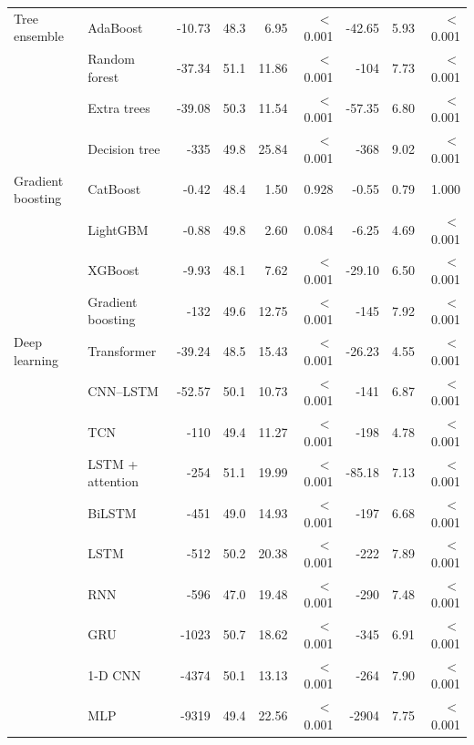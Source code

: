 \begin{table}[t]
\begin{tabular}{llrrrrrrr}
\addlinespace[2pt]
Tree ensemble & AdaBoost & -10.73 & 48.3 & 6.95 & $<$0.001 & -42.65 & 5.93 & $<$0.001 \\
 & Random forest & -37.34 & 51.1 & 11.86 & $<$0.001 & -104 & 7.73 & $<$0.001 \\
 & Extra trees & -39.08 & 50.3 & 11.54 & $<$0.001 & -57.35 & 6.80 & $<$0.001 \\
 & Decision tree & -335 & 49.8 & 25.84 & $<$0.001 & -368 & 9.02 & $<$0.001 \\
\addlinespace[2pt]
Gradient boosting & CatBoost & -0.42 & 48.4 & 1.50 & 0.928 & -0.55 & 0.79 & 1.000 \\
 & LightGBM & -0.88 & 49.8 & 2.60 & 0.084 & -6.25 & 4.69 & $<$0.001 \\
 & XGBoost & -9.93 & 48.1 & 7.62 & $<$0.001 & -29.10 & 6.50 & $<$0.001 \\
 & Gradient boosting & -132 & 49.6 & 12.75 & $<$0.001 & -145 & 7.92 & $<$0.001 \\
\addlinespace[2pt]
Deep learning & Transformer & -39.24 & 48.5 & 15.43 & $<$0.001 & -26.23 & 4.55 & $<$0.001 \\
 & CNN--LSTM & -52.57 & 50.1 & 10.73 & $<$0.001 & -141 & 6.87 & $<$0.001 \\
 & TCN & -110 & 49.4 & 11.27 & $<$0.001 & -198 & 4.78 & $<$0.001 \\
 & LSTM + attention & -254 & 51.1 & 19.99 & $<$0.001 & -85.18 & 7.13 & $<$0.001 \\
 & BiLSTM & -451 & 49.0 & 14.93 & $<$0.001 & -197 & 6.68 & $<$0.001 \\
 & LSTM & -512 & 50.2 & 20.38 & $<$0.001 & -222 & 7.89 & $<$0.001 \\
 & RNN & -596 & 47.0 & 19.48 & $<$0.001 & -290 & 7.48 & $<$0.001 \\
 & GRU & -1023 & 50.7 & 18.62 & $<$0.001 & -345 & 6.91 & $<$0.001 \\
 & 1-D CNN & -4374 & 50.1 & 13.13 & $<$0.001 & -264 & 7.90 & $<$0.001 \\
 & MLP & -9319 & 49.4 & 22.56 & $<$0.001 & -2904 & 7.75 & $<$0.001 \\
\bottomrule
\end{tabular}
\end{table}
